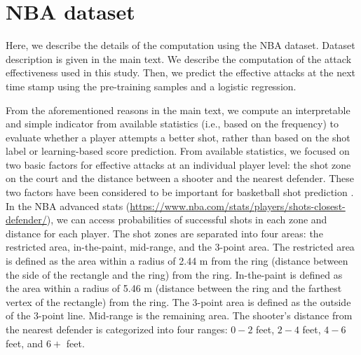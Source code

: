 \section{NBA dataset}
\label{app:nba}
Here, we describe the details of the computation using the NBA dataset.
Dataset description is given in the main text.
We describe the computation of the attack effectiveness used in this study.
Then, we predict the effective attacks at the next time stamp using the pre-training samples and a logistic regression.  %
%
%
%

%
From the aforementioned reasons in the main text, we compute an interpretable and simple indicator from available statistics (i.e., based on the frequency) to evaluate whether a player attempts a better shot, rather than based on the shot label or learning-based score prediction.
From available statistics, we focused on two basic factors for effective attacks at an individual player level: the shot zone on the court and the distance between a shooter and the nearest defender. 
These two factors have been considered to be important for basketball shot prediction \cite{Fujii16,Fujii17,Fujii18}.
In the NBA advanced stats (\url{https://www.nba.com/stats/players/shots-closest-defender/}), we can access probabilities of successful shots in each zone and distance for each player.
The shot zones are separated into four areas: the restricted area, in-the-paint, mid-range, and the 3-point area. 
The restricted area is defined as the area within a radius of 2.44 m from the ring (distance between the side of the rectangle and the ring) from the ring.
In-the-paint is defined as the area within a radius of 5.46 m (distance between the ring and the farthest vertex of the rectangle) from the ring.
The 3-point area is defined as the outside of the 3-point line. 
Mid-range is the remaining area. 
The shooter's distance from the nearest defender is categorized into four ranges: $0-2$ feet, $2-4$ feet, $4-6$ feet, and $6+$ feet.

